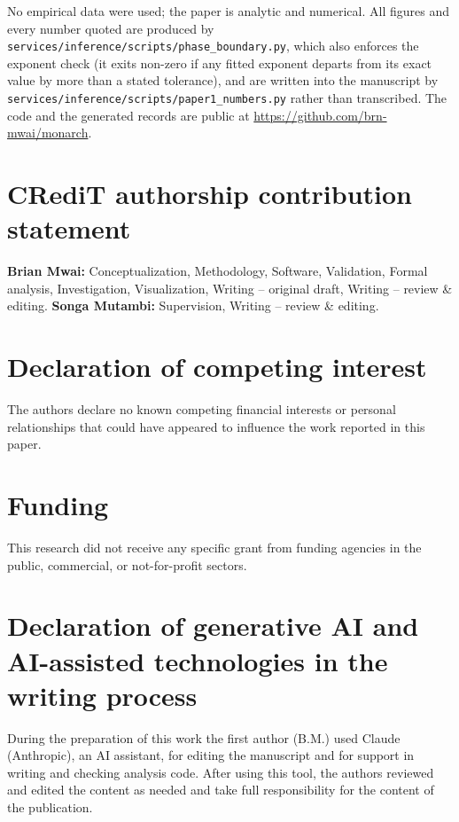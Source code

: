 \documentclass[preprint,12pt]{elsarticle}
\begin{document}
No empirical data were used; the paper is analytic and numerical. All figures and every
number quoted are produced by
\nolinkurl{services/inference/scripts/phase_boundary.py}, which also enforces the exponent check (it exits non-zero if any fitted exponent departs from
its exact value by more than a stated tolerance), and are written into the manuscript by
\nolinkurl{services/inference/scripts/paper1_numbers.py} rather than transcribed. The code and
the generated records are public at \url{https://github.com/brn-mwai/monarch}.

\section*{CRediT authorship contribution statement}

\textbf{Brian Mwai:} Conceptualization, Methodology, Software, Validation, Formal analysis,
Investigation, Visualization, Writing -- original draft, Writing -- review \& editing.
\textbf{Songa Mutambi:} Supervision, Writing -- review \& editing.

\section*{Declaration of competing interest}

The authors declare no known competing financial interests or personal relationships that
could have appeared to influence the work reported in this paper.

\section*{Funding}

This research did not receive any specific grant from funding agencies in the public,
commercial, or not-for-profit sectors.

\section*{Declaration of generative AI and AI-assisted technologies in the writing process}

During the preparation of this work the first author (B.M.) used Claude (Anthropic), an AI
assistant, for editing the manuscript and for support in writing and checking analysis code.
After using this tool, the authors reviewed and edited the content as needed and take full
responsibility for the content of the publication.
\end{document}
